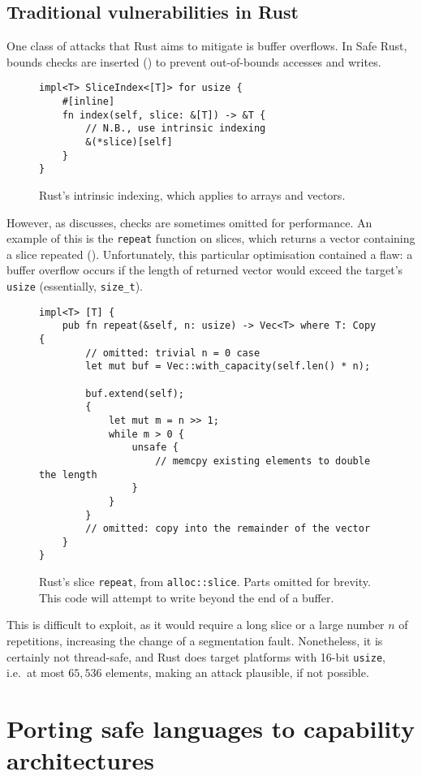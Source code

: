 \documentclass[dissertation.tex]{subfiles}
\begin{document}
\subsection{Traditional vulnerabilities in Rust}
\label{sec:rust-vulns}


One class of attacks that Rust aims to mitigate is buffer overflows.
In Safe Rust, bounds checks are inserted ()
to prevent out-of-bounds accesses and writes.

\begin{figure}[ht]
\begin{lstlisting}
impl<T> SliceIndex<[T]> for usize {
    #[inline]
    fn index(self, slice: &[T]) -> &T {
        // N.B., use intrinsic indexing
        &(*slice)[self]
    }
}
\end{lstlisting}
\caption{ Rust's intrinsic indexing, which applies to
arrays and vectors.}
\label{lst:rust-index}
\end{figure}

However, as  discusses, checks are
sometimes omitted for performance.
An example of this is the \texttt{repeat} function on slices, which
returns a vector containing a slice repeated
().
Unfortunately, this particular optimisation contained a flaw: a buffer
overflow occurs if the length of returned vector would exceed the
target's \texttt{usize} (essentially, \texttt{size\_t}).

\begin{figure}[ht]
\begin{lstlisting}
impl<T> [T] {
    pub fn repeat(&self, n: usize) -> Vec<T> where T: Copy {
        // omitted: trivial n = 0 case
        let mut buf = Vec::with_capacity(self.len() * n);

        buf.extend(self);
        {
            let mut m = n >> 1;
            while m > 0 {
                unsafe {
                    // memcpy existing elements to double the length
                }
            }
        }
        // omitted: copy into the remainder of the vector
    }
}
\end{lstlisting}
\caption{ Rust's slice \texttt{repeat}, from
\texttt{alloc::slice}. Parts omitted for brevity. This code will attempt
to write beyond the end of a buffer.}
\label{lst:slice-repeat}
\end{figure}

This is difficult to exploit, as it would require a long slice or a
large number \(n\) of repetitions, increasing the change of a
segmentation fault.
Nonetheless, it is certainly not thread-safe, and Rust does target
platforms with 16-bit \texttt{usize}, i.e.~at most \(65,536\) elements,
making an attack plausible, if not possible.



\section{Porting safe languages to capability architectures}
\end{document}
